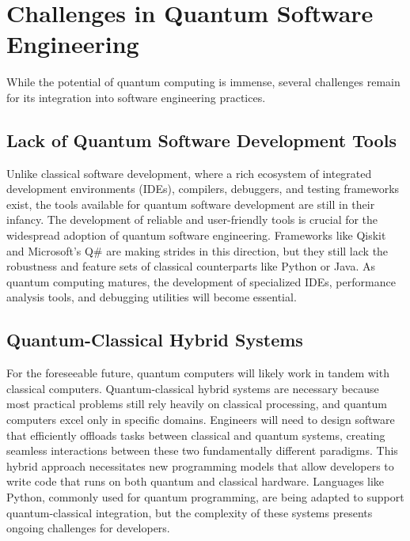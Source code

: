 \documentclass{article}
\begin{document}
\section{Challenges in Quantum Software Engineering}
While the potential of quantum computing is immense, several challenges remain for its integration into software engineering practices.

\subsection{Lack of Quantum Software Development Tools}

Unlike classical software development, where a rich ecosystem of integrated development environments (IDEs), compilers, debuggers, and testing frameworks exist, the tools available for quantum software development are still in their infancy. The development of reliable and user-friendly tools is crucial for the widespread adoption of quantum software engineering.
Frameworks like Qiskit and Microsoft’s Q\# are making strides in this direction, but they still lack the robustness and feature sets of classical counterparts like Python or Java. As quantum computing matures, the development of specialized IDEs, performance analysis tools, and debugging utilities will become essential.

\subsection{Quantum-Classical Hybrid Systems}
For the foreseeable future, quantum computers will likely work in tandem with classical computers. Quantum-classical hybrid systems are necessary because most practical problems still rely heavily on classical processing, and quantum computers excel only in specific domains. Engineers will need to design software that efficiently offloads tasks between classical and quantum systems, creating seamless interactions between these two fundamentally different paradigms.
This hybrid approach necessitates new programming models that allow developers to write code that runs on both quantum and classical hardware. Languages like Python, commonly used for quantum programming, are being adapted to support quantum-classical integration, but the complexity of these systems presents ongoing challenges for developers.
\end{document}

